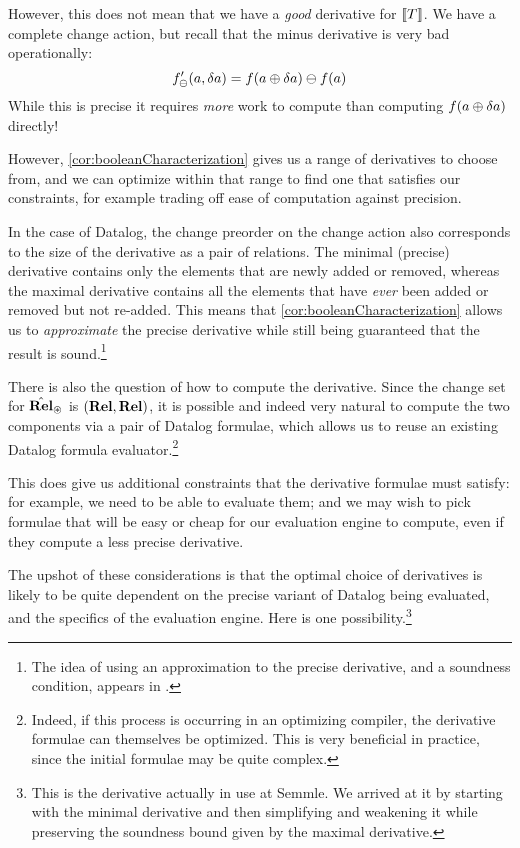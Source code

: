 However, this does not mean that we have a \emph{good} derivative for
$\llbracket T \rrbracket$. We have a complete change action, but recall that the minus derivative
is very bad operationally:
\begin{displaymath}
  f'_\ominus(a, \delta a) = f(a \oplus \delta a) \ominus f(a)
\end{displaymath}
While this is precise it requires \emph{more} work to compute than computing $f(a \oplus \delta a)$ directly!

However, \cref{cor:booleanCharacterization} gives us a range of derivatives to
choose from, and we can optimize within that range to find one that satisfies
our constraints, for example trading off ease of computation against precision.

In the case of Datalog, the change preorder on the change action also
corresponds to the size of the derivative as a pair of relations. The minimal (precise)
derivative contains only the elements that are newly added or removed,
whereas the maximal derivative contains all the elements that have \emph{ever}
been added or removed but not re-added. This means that \cref{cor:booleanCharacterization} allows
us to \emph{approximate} the precise derivative while still being
guaranteed that the result is sound.\footnote{The idea of using an approximation
to the precise derivative, and a soundness condition, appears in \textcite{bancilhon1986amateur}.}

There is also the question of how to compute the derivative. Since the change
set for $\hat{\mathbf{Rel}}_\circledast$ is $\left( \mathbf{Rel}, \mathbf{Rel} \right)$, it
is possible and indeed very natural to compute the two components via a pair of
Datalog formulae, which allows us to reuse an existing Datalog formula
evaluator.\footnote{
  Indeed, if this process is occurring in an optimizing compiler,
  the derivative formulae can themselves be optimized. This is very 
  beneficial in practice, since the initial formulae may be quite complex.}

This does give us additional constraints that the derivative formulae must satisfy:
for example, we need to be able to evaluate them; and we may wish to pick formulae that will be easy or cheap
for our evaluation engine to compute, even if they compute a less precise derivative.

The upshot of these considerations is that the optimal choice of derivatives is likely
to be quite dependent on the precise variant of Datalog being evaluated, and the
specifics of the evaluation engine. Here is one possibility.\footnote{This is
  the derivative actually in use at Semmle. We arrived at it by starting with the
  minimal derivative and then simplifying and weakening it while preserving the
  soundness bound given by the maximal derivative.}

